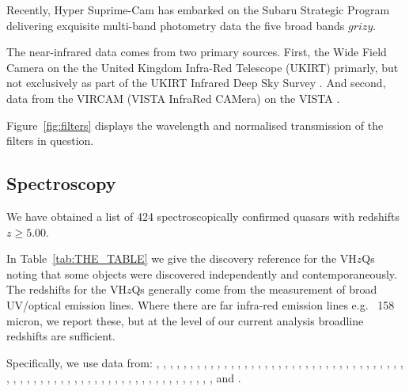 \documentclass[usenatbib]{mnras}
\begin{document}
Recently, Hyper Suprime-Cam \citep[HSC; ][]{Miyazaki2018} has embarked
on the Subaru Strategic Program \citep[SSP; ][]{Aihara2018a}
delivering exquisite multi-band photometry data
\citep[][]{Aihara2018b} the five broad bands $grizy$.

The near-infrared data comes from two primary sources. First, the Wide
Field Camera \citep[WFCAM; ][]{Casali2007} on the the United Kingdom
Infra-Red Telescope (UKIRT) primarly, but not exclusively as part of
the UKIRT Infrared Deep Sky Survey \citep[UKIDSS; ][]{Lawrence2007}.
And second, data from the VIRCAM (VISTA InfraRed CAMera) on the VISTA
\citep[Visible and Infrared Survey Telescope for
Astronomy;][]{Emerson2006, Dalton2006}.

Figure~\ref{fig:filters} displays the wavelength and normalised transmission 
of the filters in question. 




\subsection{Spectroscopy} 
We have obtained a list of 424 spectroscopically confirmed 
quasars with redshifts $z\geq5.00$. 

In Table~\ref{tab:THE_TABLE}  we give the discovery reference for the
VH$z$Qs noting that some objects were discovered independently and
contemporaneously.  The redshifts for the VH$z$Qs generally come from
the measurement of broad UV/optical emission lines. Where 
there are far infra-red emission lines e.g. \cii~158 micron, we report 
these, but at the level of our current analysis broadline redshifts are
sufficient. 

Specifically, we use data from: \citet{Fan2000}, \citet{Fan2001c},
\citet{Fan2003}, \citet{Fan2004}, \citet{Mahabal2005},
\citet{Cool2006}, \citet{Fan2006}, \citet{Goto2006},
\citet{McGreer2006}, \citet{Carilli2007}, \citet{Kurk2007},
\citet{Stern2007}, \citet{Venemans2007}, \citet{Willott2007},
\citet{Jiang2008}, \citet{Wang2008}, \citet{Jiang2009}, \citet{Kurk2009}, 
\citet{Mortlock2009}, \citet{Willott2009}, \citet{Carilli2010}, 
\citet{Wang2010}, \citet{Willott2010a}, \citet{Willott2010b}, 
\citet{DeRosa2011}, \citet{Mortlock2011}, \citet{Wang2011}, 
\citet{Zeimann2011}, \citet{Morganson2012}, \citet{Venemans2012}, 
\citet{McGreer2013}, \citet{Venemans2013}, \citet{Wang2013}, 
\citet{Willott2013b}, \citet{Banados2014}, \citet{Calura2014}, 
\citet{Leipski2014}, \citet{Banados2015a}, \citet{Banados2015b}, 
\citet{Becker2015}, \citet{Carnall2015}, \citet{Jiang2015}, 
\citet{Kashikawa2015}, \citet{Kim2015}, \citet{Reed2015}, 
\citet{Venemans2015a}, \citet{Venemans2015b}, \citet{Willott2015}, 
\citet{Wu2015}, \citet{Venemans2016}, \citet{Wang2016_WISE}, 
\citet{Matsuoka2016}, \citet{WangR2016}, \citet{Mortlock2011},
\citet{McGreer2013}, \citet{Venemans2013}, \citet{Venemans2013},
\citet{Venemans2015a}, \citet{Venemans2015b}, \citet{Banados2016},
\citet{Matsuoka2016}, \citet{Reed2017}, \citet{Wang2017},
\citet{Mazzucchelli2017}, \citet{Ikeda2017}, \citet{Tang2017},
\citet{Koptelova2017}, \citet{Banados2018}, \citet{Matsuoka2018a} 
and \citet{Matsuoka2018b}. 
\end{document}

